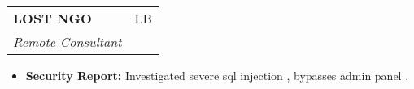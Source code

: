 \documentclass[letterpaper,11pt]{article}
\makeatletter
\newcommand{\resumeItem}[1]{
  \item\small{
    {#1 \vspace{-2pt}}
  }
}
\newcommand{\resumeSubheading}[4]{
  \vspace{-2pt}\item
    \begin{tabular*}{\textwidth}[t]{l@{\extracolsep{\fill}}r}
      \normalsize\textbf{#1} & #2 \\
      \textit{\small#3} & \textit{\small #4} \\
    \end{tabular*}\vspace{-7pt}
}
\newcommand{\resumeItemListStart}{\begin{itemize}[leftmargin=.4in, labelsep=.13in]}
\newcommand{\resumeItemListEnd}{\end{itemize}\vspace{-5pt}}
\makeatother
\begin{document}

    \resumeSubheading
      {LOST NGO}{LB}
      {Remote Consultant}{}
      \resumeItemListStart
        
        \resumeItem{\textbf{Security Report:} Investigated severe sql injection , bypasses admin panel .}
      \resumeItemListEnd
    
\end{document}
